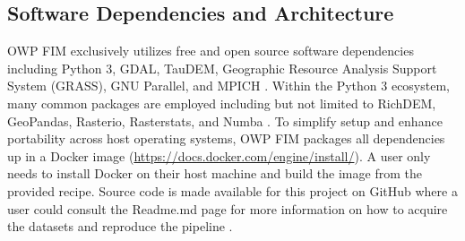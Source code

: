 \documentclass[draft]{dependencies/agujournal2019}
\begin{document}
\subsection{Software Dependencies and Architecture}
\label{ssec:software}
%
OWP FIM exclusively utilizes free and open source software dependencies including Python 3, GDAL, TauDEM, Geographic Resource Analysis Support System (GRASS), GNU Parallel, and MPICH \cite{python382,gdal2020,tarboton2005terrain,grass2020,tange2015gnu,amer2021mpich}.
Within the Python 3 ecosystem, many common packages are employed including but not limited to RichDEM, GeoPandas, Rasterio, Rasterstats, and Numba \cite{barnes2018richdem,jordahl2014geopandas,lam2015numba}. 
To simplify setup and enhance portability across host operating systems, OWP FIM packages all dependencies up in a Docker image (\url{https://docs.docker.com/engine/install/}). 
A user only needs to install Docker on their host machine and build the image from the provided recipe. 
Source code is made available for this project on GitHub where a user could consult the Readme.md page for more information on how to acquire the datasets and reproduce the pipeline \cite{inundationMapping2022}.
%
\end{document}
